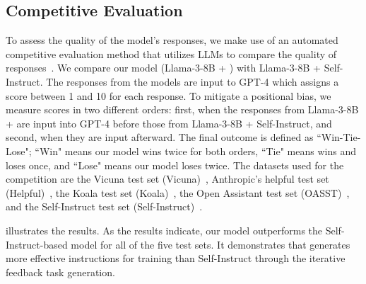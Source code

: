 \subsection{Competitive Evaluation}
\begin{comment}
\cancel{
In this experiment, for a direct comparison of the quality of the model's responses,
referring to previous studies~\cite{alpagasus, alpacafarm}, we employ an 
automated evaluation method using an API-based LLM to compare our model and baseline.
The responses from both models are input into an evaluation model (e.g., GPT-4), 
which is instructed to assign a score between 1 and 10 for each response.
\review{To mitigate positional bias, 
we evaluate both when our model’s response is placed before and when it is placed after the baseline model’s response.
The final outcome is defined as ``Win-Tie-Lose"; ``Win" means our model wins twice for both orders, ``Tie" means wins once and loses once, and ``Lose" means our model loses twice.}
The datasets used for the competition are the Vicuna test set (Vicuna)~\cite{vicuna1}, Anthropic's 
helpful test set (Helpful)~\cite{helpful}, the Koala test set (Koala)~\cite{koala}, the Open Assistant test set (OASST)~\cite{oasst}, 
and the Self-Instruct test set (Self-Instruct)~\cite{self-instruct}.}
\end{comment}
To assess the quality of the model's responses,
we make use of an automated competitive evaluation method 
that utilizes LLMs to compare the quality of responses~\cite{alpagasus, alpacafarm}. 
We compare our model (Llama-3-8B + \ours{}) 
with Llama-3-8B + Self-Instruct.
The responses from the models are input to GPT-4
which assigns a score between 1 and 10 for each response.
To mitigate a positional bias, 
we measure scores in two different orders:
first, when the responses from Llama-3-8B + \ours{} are input into GPT-4 
before those from Llama-3-8B + Self-Instruct, and second, when they are input afterward.
The final outcome is defined as ``Win-Tie-Lose"; ``Win" means our model wins twice for both orders, 
``Tie" means wins and loses once, and ``Lose" means our model loses twice.
The datasets used for the competition are the Vicuna test set (Vicuna)~\cite{vicuna1}, Anthropic's 
helpful test set (Helpful)~\cite{helpful}, the Koala test set (Koala)~\cite{koala}, the Open Assistant test set (OASST)~\cite{oasst}, 
and the Self-Instruct test set (Self-Instruct)~\cite{self-instruct}.


 illustrates the results. 
As the results indicate, our model outperforms the 
Self-Instruct-based model for all of the five test sets.
It demonstrates that \ours{} generates more 
effective instructions for training than Self-Instruct through the iterative
feedback task generation.



